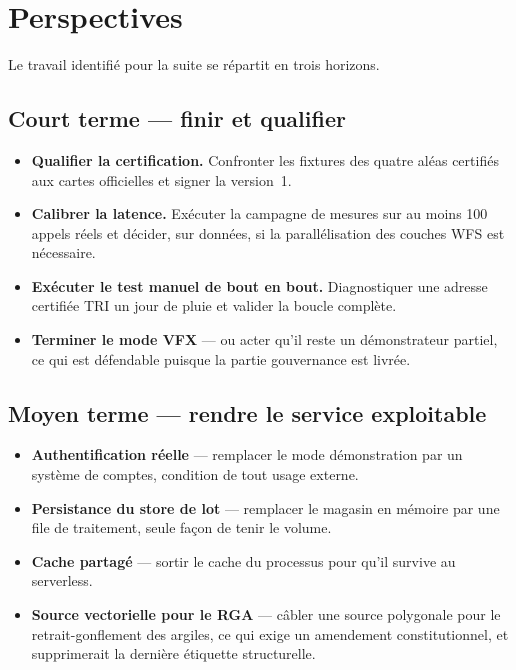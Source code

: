 \section{Perspectives}

Le travail identifié pour la suite se répartit en trois horizons.

\subsection{Court terme — finir et qualifier}

\begin{itemize}[leftmargin=1.4em]
  \item \textbf{Qualifier la certification.} Confronter les fixtures des
        quatre aléas certifiés aux cartes officielles et signer la version~1.
  \item \textbf{Calibrer la latence.} Exécuter la campagne de mesures sur au
        moins 100 appels réels et décider, sur données, si la parallélisation
        des couches WFS est nécessaire.
  \item \textbf{Exécuter le test manuel de bout en bout.} Diagnostiquer une
        adresse certifiée TRI un jour de pluie et valider la boucle complète.
  \item \textbf{Terminer le mode VFX} — ou acter qu'il reste un démonstrateur
        partiel, ce qui est défendable puisque la partie gouvernance est livrée.
\end{itemize}

\subsection{Moyen terme — rendre le service exploitable}

\begin{itemize}[leftmargin=1.4em]
  \item \textbf{Authentification réelle} — remplacer le mode démonstration par
        un système de comptes, condition de tout usage externe.
  \item \textbf{Persistance du store de lot} — remplacer le magasin en mémoire
        par une file de traitement, seule façon de tenir le volume.
  \item \textbf{Cache partagé} — sortir le cache du processus pour qu'il
        survive au serverless.
  \item \textbf{Source vectorielle pour le RGA} — câbler une source
        polygonale pour le retrait-gonflement des argiles, ce qui exige un
        amendement constitutionnel, et supprimerait la dernière étiquette
         structurelle.
\end{itemize}

